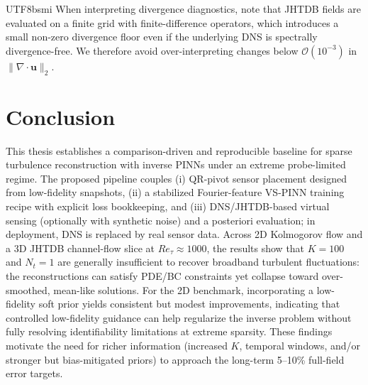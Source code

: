 \documentclass[master]{NTHUthesis}
\begin{document}
\begin{CJK*}{UTF8}{bsmi}
When interpreting divergence diagnostics, note that JHTDB fields are evaluated on a finite grid with finite-difference operators, which introduces a small non-zero divergence floor even if the underlying DNS is spectrally divergence-free. We therefore avoid over-interpreting changes below $\mathcal{O}(10^{-3})$ in $\|\nabla\cdot\mathbf{u}\|_2$.

\section{Conclusion}
This thesis establishes a comparison-driven and reproducible baseline for sparse turbulence reconstruction with inverse PINNs under an extreme probe-limited regime. The proposed pipeline couples (i) QR-pivot sensor placement designed from low-fidelity snapshots, (ii) a stabilized Fourier-feature VS-PINN training recipe with explicit loss bookkeeping, and (iii) DNS/JHTDB-based virtual sensing (optionally with synthetic noise) and a posteriori evaluation; in deployment, DNS is replaced by real sensor data.
Across 2D Kolmogorov flow and a 3D JHTDB channel-flow slice at $Re_\tau \approx 1000$, the results show that $K=100$ and $N_t=1$ are generally insufficient to recover broadband turbulent fluctuations: the reconstructions can satisfy PDE/BC constraints yet collapse toward over-smoothed, mean-like solutions. For the 2D benchmark, incorporating a low-fidelity soft prior yields consistent but modest improvements, indicating that controlled low-fidelity guidance can help regularize the inverse problem without fully resolving identifiability limitations at extreme sparsity. These findings motivate the need for richer information (increased $K$, temporal windows, and/or stronger but bias-mitigated priors) to approach the long-term 5--10\% full-field error targets.
	

\end{CJK*}
\end{document}
